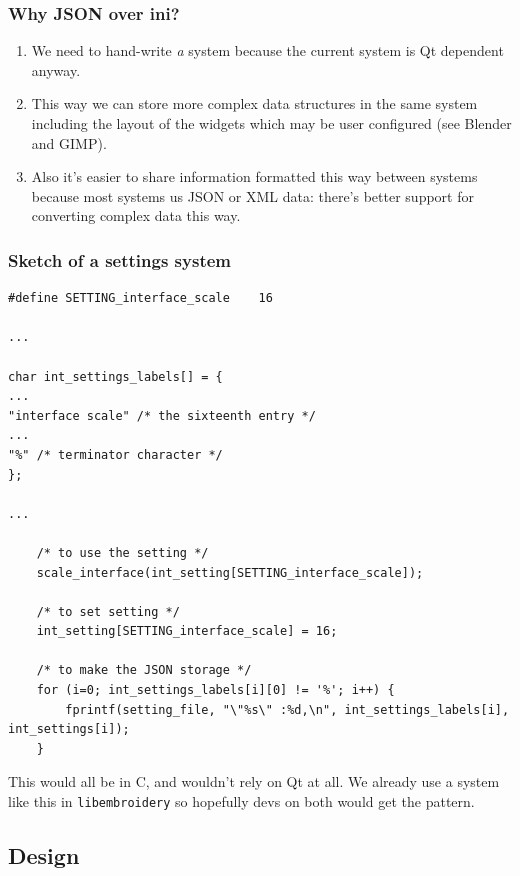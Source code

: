\documentclass[a4paper, 11pt]{report}
\begin{document}
\hypertarget{why-json-over-ini}{%
\subsubsection{Why JSON over ini?}\label{why-json-over-ini}}

\begin{enumerate}
\def\labelenumi{\arabic{enumi}.}
\item
  We need to hand-write \emph{a} system because the current system is Qt
  dependent anyway.
\item
  This way we can store more complex data structures in the same system
  including the layout of the widgets which may be user configured (see
  Blender and GIMP).
\item
  Also it's easier to share information formatted this way between
  systems because most systems us JSON or XML data: there's better
  support for converting complex data this way.
\end{enumerate}

\hypertarget{sketch-of-a-settings-system}{%
\subsubsection{Sketch of a settings
system}\label{sketch-of-a-settings-system}}

\begin{verbatim}
#define SETTING_interface_scale    16

...

char int_settings_labels[] = {
...
"interface scale" /* the sixteenth entry */
...
"%" /* terminator character */
};

...

    /* to use the setting */
    scale_interface(int_setting[SETTING_interface_scale]);

    /* to set setting */
    int_setting[SETTING_interface_scale] = 16;

    /* to make the JSON storage */
    for (i=0; int_settings_labels[i][0] != '%'; i++) {
        fprintf(setting_file, "\"%s\" :%d,\n", int_settings_labels[i], int_settings[i]);
    }
\end{verbatim}

This would all be in C, and wouldn't rely on Qt at all. We already use a
system like this in \texttt{libembroidery} so hopefully devs on both
would get the pattern.

\hypertarget{design}{%
\subsection{Design}\label{design}}
\end{document}
